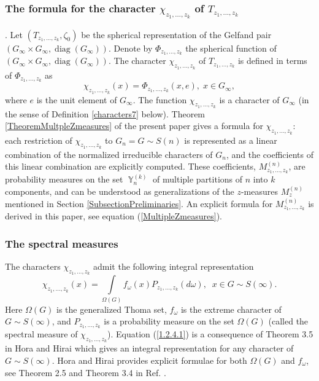 \documentclass[12pt]{amsart}
\theoremstyle{definition}
\numberwithin{equation}{section}
\DeclareMathOperator{\Y}{\mathbb{Y}}
\DeclareMathOperator{\diag}{diag}
\begin{document}
\subsubsection{The formula for the character $\chi_{z_1,\ldots,z_k}$ of $T_{z_1,\ldots,z_k}$}.
Let $\left(T_{z_1,\ldots,z_k},\zeta_{0}\right)$ be the spherical representation of the Gelfand pair  $\left(G_{\infty}\times G_{\infty},\diag\left(G_{\infty}\right)\right)$.
Denote by $\Phi_{z_1,\ldots,z_k}$ the spherical function of $\left(G_{\infty}\times G_{\infty},\diag\left(G_{\infty}\right)\right)$. The character $\chi_{z_1,\ldots,z_k}$ of $T_{z_1,\ldots,z_k}$ is defined in terms of $\Phi_{z_1,\ldots,z_k}$ as
$$
\chi_{z_1,\ldots,z_k}(x)=\Phi_{z_1,\ldots,z_k}(x,e),\; x\in G_{\infty},
$$
where $e$ is the unit element of $G_{\infty}$. The function $\chi_{z_1,\ldots,z_k}$ is a character of $G_{\infty}$ (in the sense of Definition \ref{characters7} below).  Theorem \ref{TheoremMultpleZmeasures} of the present paper gives a formula  for $\chi_{z_1,\ldots,z_k}$:
each restriction of $\chi_{z_1,\ldots,z_k}$ to $G_n=G\sim S(n)$ is represented as a linear combination of the normalized irreducible characters of $G_n$, and the coefficients of this linear combination are explicitly computed. These coefficients, $M_{z_1,\ldots,z_k}^{(n)}$, are probability measures on the set $\Y_n^{(k)}$ of multiple partitions of $n$ into $k$ components, and can be understood as generalizations of the $z$-measures $M^{(n)}_{z}$ mentioned in Section \ref{SubsectionPreliminaries}. An  explicit formula for $M_{z_1,\ldots,z_k}^{(n)}$ is derived in this paper, see equation (\ref{MultipleZmeasures}).
\subsubsection{The spectral measures}
The characters $\chi_{z_1,\ldots,z_k}$ admit the following integral representation
\begin{equation}\label{1.2.4.1}
\chi_{z_1,\ldots,z_k}(x)=\int\limits_{\Omega\left(G\right)}f_{\omega}(x)P_{z_1,\ldots,z_k}(d\omega),\;\; x\in G\sim S(\infty).
\end{equation}
Here $\Omega\left(G\right)$ is the generalized Thoma set, $f_{\omega}$ is the extreme character of $G\sim S(\infty)$, and  $P_{z_1,\ldots,z_k}$ is a probability measure on the set $\Omega\left(G\right)$ (called the spectral measure of
$\chi_{z_1,\ldots,z_k}$). Equation (\ref{1.2.4.1}) is a consequence of Theorem 3.5 in Hora and Hirai \cite{HoraHirai} which gives an integral representation for any character of $G\sim S(\infty)$. Hora and Hirai
\cite{HoraHirai} provides explicit formulae for both $\Omega\left(G\right)$ and $f_{\omega}$, see Theorem 2.5 and Theorem 3.4 in Ref. \cite{HoraHirai}.
\end{document}

